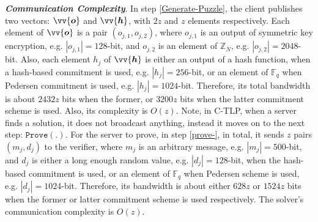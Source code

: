  \noindent\textbf{\textit{Communication Complexity}}.  In step \ref{Generate-Puzzle}, the client publishes two vectors: $\vv{\bm{o}}$ and $\vv{\bm{h}}$, with  $2 z$ and $z$ elements respectively.  Each element of $\vv{\bm{o}}$ is a pair $(o_{\scriptscriptstyle j,1},o_{\scriptscriptstyle j,2})$, where $o_{\scriptscriptstyle j,1}$ is an output of symmetric key encryption, e.g.   $|o_{\scriptscriptstyle j,1}|=128$-bit, and $o_{\scriptscriptstyle j,2}$ is an element of $\mathbb{Z}_{\scriptscriptstyle N}$, e.g.  $|o_{\scriptscriptstyle j,2}|=2048$-bit. Also, each element $h_{\scriptscriptstyle j}$ of $\vv{\bm{h}}$ is either an output of a hash function, when a hash-based commitment is used, e.g.  $|h_{\scriptscriptstyle j}|=256$-bit, or an element of $\mathbb{F}_{\scriptscriptstyle q}$ when Pedersen commitment is used, e.g.  $|h_{\scriptscriptstyle j}|=1024$-bit. Therefore, its total bandwidth is about $2432 z$ bits when the former,  or $3200 z$ bits when the latter commitment scheme is used. Also, its   complexity is $O(z)$. Note,  in  C-TLP, when a server finds a solution, it does not broadcast anything, instead it moves on  to the next step:  $\mathtt{Prove}(.)$. For the server to prove, in step \ref{prove-},  in total,  it sends $z$ pairs $(m_{\scriptscriptstyle j},d_{\scriptscriptstyle j})$ to the verifier, where $m_{\scriptscriptstyle j}$  is an arbitrary message, e.g.  $|m_{\scriptscriptstyle j}|=500$-bit, and  $d_{\scriptscriptstyle j}$ is either a long enough random value, e.g. $|d_{\scriptscriptstyle j}|=128$-bit, when the hash-based commitment is used, or an element of $\mathbb{F}_{\scriptscriptstyle q}$ when Pedersen scheme is used, e.g. $|d_{\scriptscriptstyle j}|=1024$-bit. Therefore, its bandwidth is about either $628 z$ or $1524 z$ bits when the former or latter commitment scheme is used respectively. The solver's  communication complexity is $O(z)$. 
 

 
